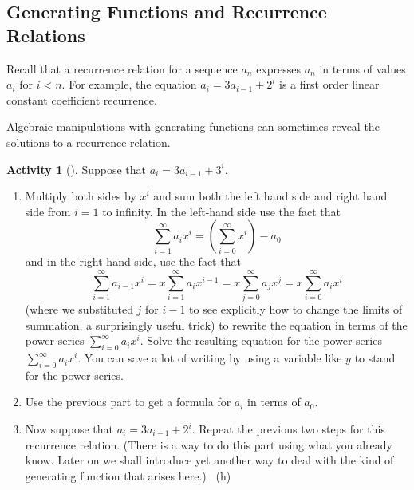\documentclass[10pt,]{book}
\theoremstyle{plain}
\theoremstyle{definition}
\theoremstyle{definition}
\theoremstyle{definition}
\newtheorem{activity}[project]{Activity}
\numberwithin{equation}{chapter}
\newcommand{\lt}{<}
\begin{document}
\subsection[{Generating Functions and Recurrence Relations}]{Generating Functions and Recurrence Relations}\label{subsection-36}
\hypertarget{p-1332}{}%
Recall that a recurrence relation for a sequence \(a_n\) expresses \(a_n\) in terms of values \(a_i\) for \(i\lt n\). For example, the equation \(a_i=3a_{i-1} +2^i\) is a first order linear constant coefficient recurrence.%
\par
\hypertarget{p-1333}{}%
Algebraic manipulations with generating functions can sometimes reveal the solutions to a recurrence relation.%
\begin{activity}[]\label{substituteandsolve}
\hypertarget{p-1334}{}%
Suppose that \(a_i=3a_{i-1} + 3^i\).%
\begin{enumerate}[font=\bfseries,label=(\alph*),ref=\alph*]
\item\label{task-244} \hypertarget{p-1335}{}%
Multiply both sides by \(x^i\) and sum both the left hand side and right hand side from \(i=1\) to infinity.  In the left-hand side use the fact that%
\begin{equation*}
\sum_{i=1}^\infty a_ix^i = (\sum_{i=0}^\infty x^i) -a_0
\end{equation*}
and in the right hand side, use the fact that%
\begin{equation*}
\sum_{i=1}^\infty a_{i-1}x^i = x\sum_{i=1}^\infty a_ix^{i-1}
=x\sum_{j=0}^\infty a_jx^j =x\sum_{i=0}^\infty a_ix^i
\end{equation*}
(where we substituted \(j\) for \(i-1\) to see explicitly how to change the limits of summation, a surprisingly useful trick) to rewrite the equation in terms of the power series \(\sum_{i=0}^\infty a_ix^i\).  Solve the resulting equation for the power series \(\sum_{i=0}^\infty a_ix^i\). You can save a lot of writing by using a variable like \(y\) to stand for the power series.%
\item\label{task-245} \hypertarget{p-1337}{}%
Use the previous part to get a formula for \(a_i\) in terms of \(a_0\).%
\item\label{task-246} \hypertarget{p-1339}{}%
Now suppose that \(a_i=3a_{i-1} + 2^i\).  Repeat the previous two steps for this recurrence relation.  (There is a way to do this part using what you already know.  Later on we shall introduce yet another way to deal with the kind of generating function that arises here.)%
~{\tiny (h)}\end{enumerate}
\end{activity}
\end{document}
